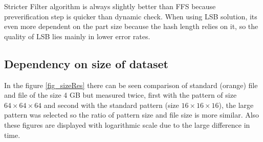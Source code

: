 Stricter Filter algorithm is always slightly better than FFS because preverification step is quicker than dynamic check. When using LSB solution, its even more dependent on the part size because the hash length relies on it, so the quality of LSB lies mainly in lower error rates.


\subsection{Dependency on size of dataset}
In the figure \ref{fig_sizeRes} there can be seen comparison of standard (orange) file and file of the size 4 GB but measured twice, first with the pattern of size $64\times64\times64$ and second with the standard pattern (size $16\times16\times16$), the large pattern was selected so the ratio of pattern size and file size is more similar. Also these figures are displayed with logarithmic scale due to the large difference in time. 

